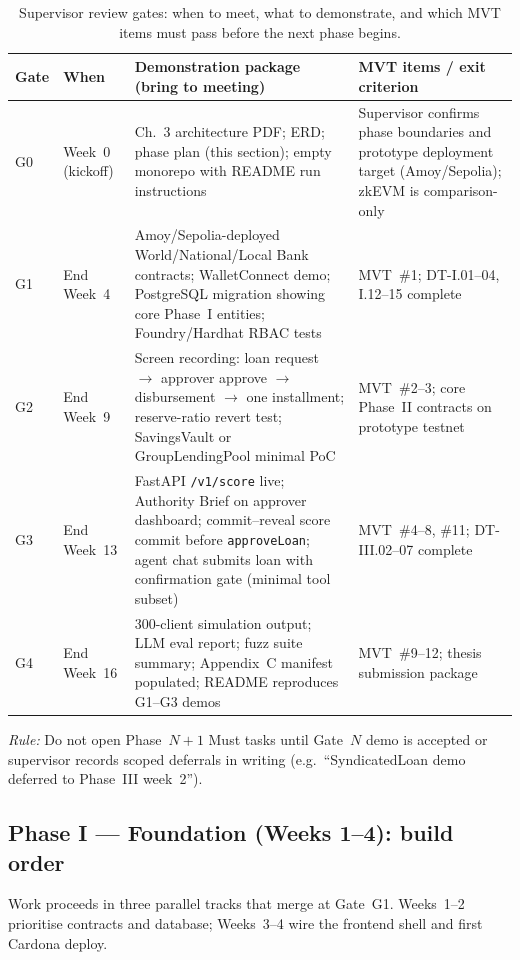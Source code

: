 \documentclass[12pt,a4paper]{report}
\newcommand{\tableheadcolor}{\rowcolor{TableHeadBg}}
\begin{document}
\begin{table}[H]
\centering
\caption[Supervisor review gates]{Supervisor review gates: when to meet, what to demonstrate, and which MVT items must pass before the next phase begins.}
\label{tab:supervisor-gates}
\small
\begin{tabular}{p{1.4cm}p{2.2cm}p{4.8cm}p{5.8cm}}
\toprule
\tableheadcolor
\textbf{Gate} & \textbf{When} & \textbf{Demonstration package (bring to meeting)} & \textbf{MVT items / exit criterion} \\
\midrule
G0 & Week~0 (kickoff) & Ch.~3 architecture PDF; ERD; phase plan (this section); empty monorepo with README run instructions & Supervisor confirms phase boundaries and prototype deployment target (Amoy/Sepolia); zkEVM is comparison-only \\
G1 & End Week~4 & Amoy/Sepolia-deployed World/National/Local Bank contracts; WalletConnect demo; PostgreSQL migration showing core Phase~I entities; Foundry/Hardhat RBAC tests & MVT~\#1; DT-I.01--04, I.12--15 complete \\
G2 & End Week~9 & Screen recording: loan request $\to$ approver approve $\to$ disbursement $\to$ one installment; reserve-ratio revert test; SavingsVault or GroupLendingPool minimal PoC & MVT~\#2--3; core Phase~II contracts on prototype testnet \\
G3 & End Week~13 & FastAPI \texttt{/v1/score} live; Authority Brief on approver dashboard; commit--reveal score commit before \texttt{approveLoan}; agent chat submits loan with confirmation gate (minimal tool subset) & MVT~\#4--8, \#11; DT-III.02--07 complete \\
G4 & End Week~16 & 300-client simulation output; LLM eval report; fuzz suite summary; Appendix~C manifest populated; README reproduces G1--G3 demos & MVT~\#9--12; thesis submission package \\
\bottomrule
\end{tabular}
\end{table}

\noindent\textit{Rule:} Do not open Phase~$N{+}1$ Must tasks until Gate~$N$ demo is accepted or supervisor records scoped deferrals in writing (e.g.\ ``SyndicatedLoan demo deferred to Phase~III week~2'').

\subsection{Phase I --- Foundation (Weeks 1--4): build order}

Work proceeds in three parallel tracks that merge at Gate~G1. Weeks~1--2 prioritise contracts and database; Weeks~3--4 wire the frontend shell and first Cardona deploy.
\end{document}
